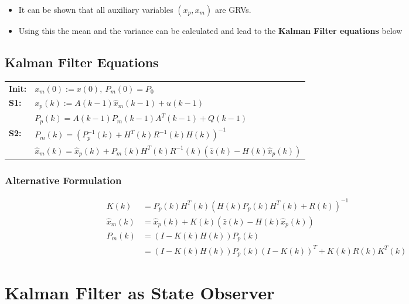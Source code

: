 \documentclass[10pt,a4paper]{scrartcl}
\begin{document}
\begin{multicols*}{2}
\begin{multicols*}{3}
\begin{itemize}
\item It can be shown that all auxiliary variables $(x_p, x_m)$ are GRVs.
\item Using this the mean and the variance can be calculated and lead to the \textbf{Kalman Filter equations} below
\end{itemize}

\subsection{Kalman Filter Equations}

\begin{tabular}{ll}
\textbf{Init:}&$x_m(0):=x(0),\ P_m(0)=P_0$\\
\textbf{S1:}&$x_p(k):=A(k-1)\hat{x}_m(k-1)+u(k-1)$\\
&$P_p(k)=A(k-1)P_m(k-1)A^T(k-1)+Q(k-1)$\\
\textbf{S2:}&$P_m(k)=(P^{-1}_p(k)+H^T(k)R^{-1}(k)H(k))^{-1}$\\
&$\hat{x}_m(k)=\hat{x}_p(k)+P_m(k)H^T(k)R^{-1}(k)(\bar{z}(k)-H(k)\hat{x}_p(k))$
\end{tabular}


\subsubsection{Alternative Formulation}

\begin{align*}
K(k)&=P_p(k)H^T(k)(H(k)P_p(k)H^T(k)+R(k))^{-1}\\
\hat{x}_m(k)&=\hat{x}_p(k)+K(k)(\bar{z}(k)-H(k)\hat{x}_p(k))\\
P_m(k)&=(I-K(k)H(k))P_p(k)\\
&=(I-K(k)H(k))P_p(k)(I-K(k))^T + K(k)R(k)K^T(k)
\end{align*}

\section{Kalman Filter as State Observer}


\end{multicols*}
\end{multicols*}
\end{document}
